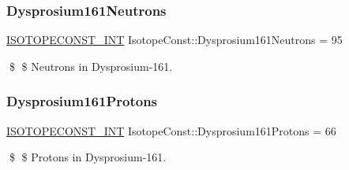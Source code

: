 \subsubsection{\texorpdfstring{Dysprosium161\+Neutrons}{Dysprosium161Neutrons}}
{\footnotesize\ttfamily \mbox{\hyperlink{group___isotope_const-_macros_ga5f18360b3e99483a35c32d789e62621c}{I\+S\+O\+T\+O\+P\+E\+C\+O\+N\+S\+T\+\_\+\+I\+NT}} Isotope\+Const\+::\+Dysprosium161\+Neutrons = 95}

\$ \$ Neutrons in Dysprosium-\/161. \mbox{\label{group___isotope_const-_dysprosium-_dy161_gac4896dd297dde8697d56d59e6edd7587}} 
\subsubsection{\texorpdfstring{Dysprosium161\+Protons}{Dysprosium161Protons}}
{\footnotesize\ttfamily \mbox{\hyperlink{group___isotope_const-_macros_ga5f18360b3e99483a35c32d789e62621c}{I\+S\+O\+T\+O\+P\+E\+C\+O\+N\+S\+T\+\_\+\+I\+NT}} Isotope\+Const\+::\+Dysprosium161\+Protons = 66}

\$ \$ Protons in Dysprosium-\/161. 